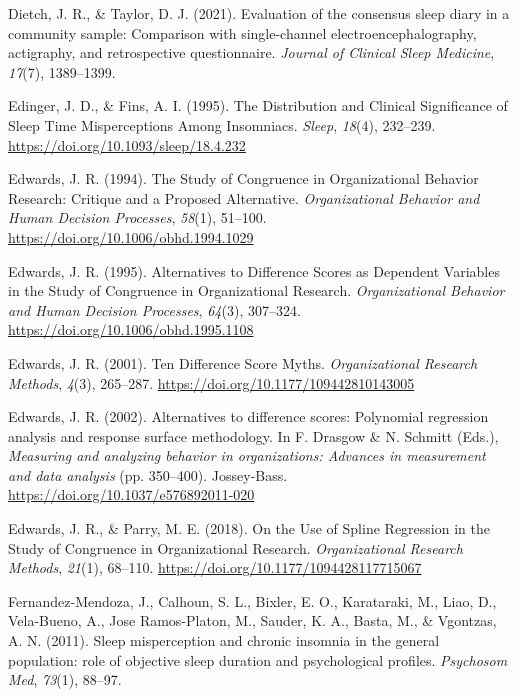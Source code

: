 \documentclass[
]{article}
\newlength{\cslhangindent}
\newenvironment{CSLReferences}[2] %
 {\begin{list}{}{%
  \setlength{\itemindent}{0pt}
  \setlength{\leftmargin}{0pt}
  \setlength{\parsep}{0pt}
  \ifodd #1
   \setlength{\leftmargin}{\cslhangindent}
   \setlength{\itemindent}{-1\cslhangindent}
  \fi
  \setlength{\itemsep}{#2\baselineskip}}}
 {\end{list}}
\begin{document}
\begin{CSLReferences}{1}{0}
Dietch, J. R., \& Taylor, D. J. (2021). Evaluation of the consensus sleep diary in a community sample: Comparison with single-channel electroencephalography, actigraphy, and retrospective questionnaire. \emph{Journal of Clinical Sleep Medicine}, \emph{17}(7), 1389--1399.

Edinger, J. D., \& Fins, A. I. (1995). {The Distribution and Clinical Significance of Sleep Time Misperceptions Among Insomniacs}. \emph{Sleep}, \emph{18}(4), 232--239. \url{https://doi.org/10.1093/sleep/18.4.232}

Edwards, J. R. (1994). {The Study of Congruence in Organizational Behavior Research: Critique and a Proposed Alternative}. \emph{Organizational Behavior and Human Decision Processes}, \emph{58}(1), 51--100. \url{https://doi.org/10.1006/obhd.1994.1029}

Edwards, J. R. (1995). Alternatives to {Difference} {Scores} as {Dependent} {Variables} in the {Study} of {Congruence} in {Organizational} {Research}. \emph{Organizational Behavior and Human Decision Processes}, \emph{64}(3), 307--324. \url{https://doi.org/10.1006/obhd.1995.1108}

Edwards, J. R. (2001). Ten {Difference} {Score} {Myths}. \emph{Organizational Research Methods}, \emph{4}(3), 265--287. \url{https://doi.org/10.1177/109442810143005}

Edwards, J. R. (2002). {Alternatives to difference scores: Polynomial regression analysis and response surface methodology}. In F. Drasgow \& N. Schmitt (Eds.), \emph{Measuring and analyzing behavior in organizations: Advances in measurement and data analysis} (pp. 350--400). Jossey-Bass. \url{https://doi.org/10.1037/e576892011-020}

Edwards, J. R., \& Parry, M. E. (2018). On the {Use} of {Spline} {Regression} in the {Study} of {Congruence} in {Organizational} {Research}. \emph{Organizational Research Methods}, \emph{21}(1), 68--110. \url{https://doi.org/10.1177/1094428117715067}

Fernandez-Mendoza, J., Calhoun, S. L., Bixler, E. O., Karataraki, M., Liao, D., Vela-Bueno, A., Jose Ramos-Platon, M., Sauder, K. A., Basta, M., \& Vgontzas, A. N. (2011). {Sleep misperception and chronic insomnia in the general population: role of objective sleep duration and psychological profiles}. \emph{Psychosom Med}, \emph{73}(1), 88--97.


\end{CSLReferences}
\end{document}
